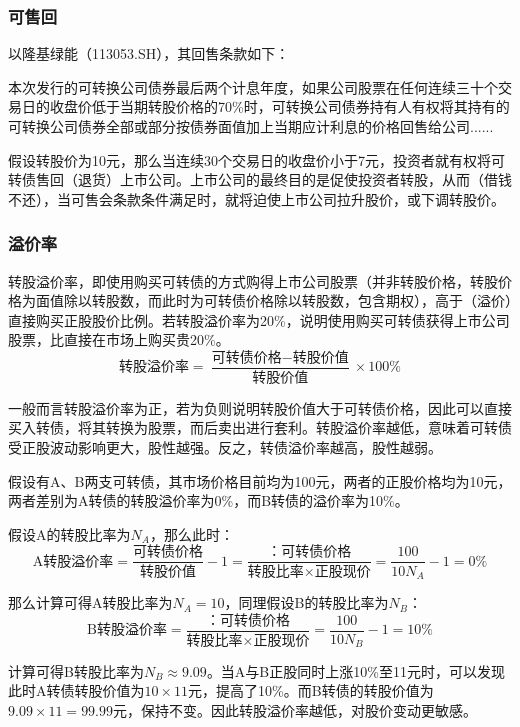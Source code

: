 \documentclass[11pt]{article}
\begin{document}
\subsubsection*{可售回}

以隆基绿能（113053.SH），其回售条款如下：
\begin{example}
    本次发行的可转换公司债券最后两个计息年度，如果公司股票在任何连续三十个交易日的收盘价低于当期转股价格的70\%时，可转换公司债券持有人有权将其持有的可转换公司债券全部或部分按债券面值加上当期应计利息的价格回售给公司......
\end{example}

假设转股价为10元，那么当连续30个交易日的收盘价小于7元，投资者就有权将可转债售回（退货）上市公司。上市公司的最终目的是促使投资者转股，从而（借钱不还），当可售会条款条件满足时，就将迫使上市公司拉升股价，或下调转股价。

\subsubsection*{溢价率}

转股溢价率，即使用购买可转债的方式购得上市公司股票（并非转股价格，转股价格为面值除以转股数，而此时为可转债价格除以转股数，包含期权），高于（溢价）直接购买正股股价比例。若转股溢价率为20\%，说明使用购买可转债获得上市公司股票，比直接在市场上购买贵20\%。
\begin{equation*}
    \text{转股溢价率} = \frac{\text{可转债价格} - \text{转股价值}}{\text{转股价值}} \times 100\%
\end{equation*}

一般而言转股溢价率为正，若为负则说明转股价值大于可转债价格，因此可以直接买入转债，将其转换为股票，而后卖出进行套利。转股溢价率越低，意味着可转债受正股波动影响更大，股性越强。反之，转债溢价率越高，股性越弱。

\begin{example}
    假设有A、B两支可转债，其市场价格目前均为100元，两者的正股价格均为10元，两者差别为A转债的转股溢价率为0\%，而B转债的溢价率为10\%。

    假设A的转股比率为$N_A$，那么此时：
    \begin{equation*}
        \text{A转股溢价率}= \frac{\text{可转债价格}}{\text{转股价值}} - 1 = \frac{：\text{可转债价格}}{\text{转股比率} \times \text{正股现价}} = \frac{100}{10 N_A} - 1 = 0\%
    \end{equation*}

    那么计算可得A转股比率为$N_A = 10$，同理假设B的转股比率为$N_B$：
    \begin{equation*}
        \text{B转股溢价率} = \frac{：\text{可转债价格}}{\text{转股比率} \times \text{正股现价}} = \frac{100}{10 N_B} - 1 = 10\%
    \end{equation*}

    计算可得B转股比率为$N_B \approx 9.09$。当A与B正股同时上涨10\%至11元时，可以发现此时A转债转股价值为$10\times 11$元，提高了10\%。而B转债的转股价值为$9.09\times 11 = 99.99$元，保持不变。因此转股溢价率越低，对股价变动更敏感。
\end{example}
\end{document}
